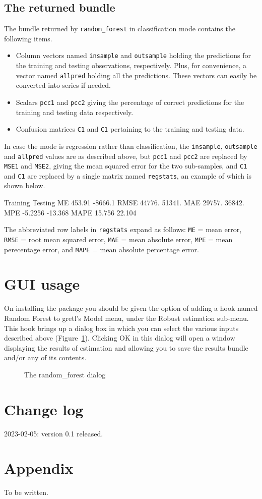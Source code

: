 \documentclass{article}
\begin{document}
\subsection{The returned bundle}

The bundle returned by \texttt{random\_forest} in classification mode
contains the following items.
\begin{itemize}
\item Column vectors named \texttt{insample} and \texttt{outsample}
  holding the predictions for the training and testing observations,
  respectively. Plus, for convenience, a vector named \texttt{allpred}
  holding all the predictions. These vectors can easily be converted
  into series if needed.
\item Scalars \texttt{pcc1} and \texttt{pcc2} giving the percentage of
  correct predictions for the training and testing data respectively.
\item Confusion matrices \texttt{C1} and \texttt{C1} pertaining to the
  training and testing data.
\end{itemize}

In case the mode is regression rather than classification, the
\texttt{insample}, \texttt{outsample} and \texttt{allpred} values are
as described above, but \texttt{pcc1} and \texttt{pcc2} are replaced
by \texttt{MSE1} and \texttt{MSE2}, giving the mean squared error for
the two sub-samples, and \texttt{C1} and \texttt{C1} are replaced by a
single matrix named \texttt{regstats}, an example of which is shown
below.
%
\begin{code}
         Training      Testing 
  ME       453.91      -8666.1 
RMSE       44776.       51341. 
 MAE       29757.       36842. 
 MPE      -5.2256      -13.368 
MAPE       15.756       22.104
\end{code}
%
The abbreviated row labels in \texttt{regstats} expand as follows:
\texttt{ME} = mean error, \texttt{RMSE} = root mean squared error,
\texttt{MAE} = mean absolute error, \texttt{MPE} = mean perecentage
error, and \texttt{MAPE} = mean absolute percentage error.


\section{GUI usage}

On installing the package you should be given the option of adding a
hook named \textsf{Random Forest} to gretl's \textsf{Model} menu, under
the \textsf{Robust estimation} sub-menu. This hook brings up a
dialog box in which you can select the various inputs described above
(Figure~\ref{fig:dialog}). Clicking \textsf{OK} in this dialog will
open a window displaying the results of estimation and allowing you to
save the results bundle and/or any of its contents.

\begin{figure}[htbp]
  \centering
  \caption{The random\_forest dialog}
  \label{fig:dialog}
\end{figure}

\section*{Change log}

2023-02-05: version 0.1 released.

\section*{Appendix}

To be written.
\end{document}
